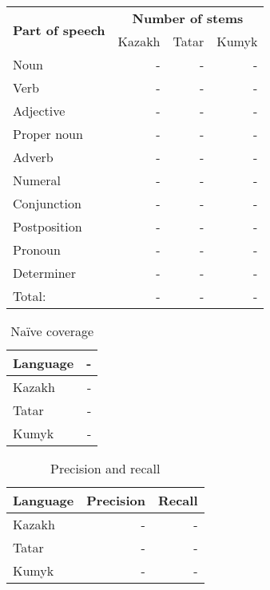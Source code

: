 \documentclass{article}
\begin{document}
\begin{table}
\begin{center}
\begin{tabular}{lrrr}
		\hline
\multirow{2}{*}{\textbf{Part of speech}} & \multicolumn{3}{|c|}{\textbf{Number of stems}} \\
                        & Kazakh & Tatar & Kumyk \\
		\hline
		Noun & - & - & - \\
		Verb & - & - & - \\
		Adjective & - & - & - \\
		Proper noun & - & - & - \\
		Adverb & - & - & - \\
		Numeral & - & - & - \\
		Conjunction & - & - & - \\
		Postposition & - & - & - \\
		Pronoun & - & - & - \\
		Determiner & - & - & - \\
		\hline
		Total: & - & - & - \\
		\hline
\end{tabular}
\end{center}

\end{table}

\begin{table}
\begin{center}
\begin{tabular}{lr}
\textbf{Language} & - \\
\hline
Kazakh & - \\
Tatar & - \\
Kumyk & - \\
\hline
\end{tabular}
 \caption{Naïve coverage}
 \label{table:coverage}
\end{center}
\end{table}

\begin{table}
\begin{center}
\begin{tabular}{lrr}
\textbf{Language} & \textbf{Precision} & \textbf{Recall} \\
\hline
Kazakh & - &  - \\
Tatar & - & - \\
Kumyk & - & - \\
\hline
\end{tabular}
 \caption{Precision and recall}
 \label{table:coverage}
\end{center}
\end{table}
\end{document}
